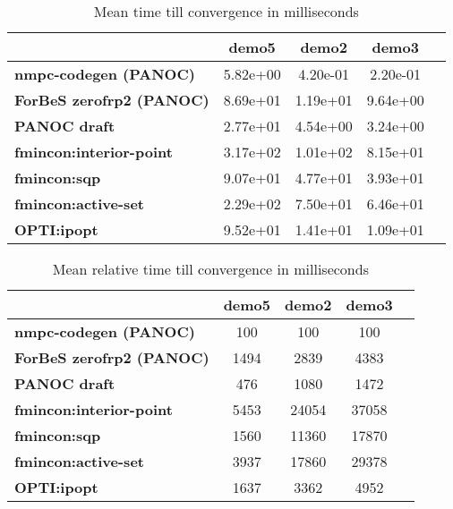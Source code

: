 \begin{table}[H]
	\centering
	\begin{tabular}{|l|c|c|c|c|}
		\hline
		&\textbf{demo5}&\textbf{demo2}&\textbf{demo3}\\\hline
		\textbf{nmpc-codegen (PANOC)}&5.82e+00&4.20e-01&2.20e-01\\\hline
		\textbf{ForBeS zerofrp2 (PANOC)}&8.69e+01&1.19e+01&9.64e+00\\\hline
		\textbf{PANOC draft}&2.77e+01&4.54e+00&3.24e+00\\\hline
		\textbf{fmincon:interior-point}&3.17e+02&1.01e+02&8.15e+01\\\hline
		\textbf{fmincon:sqp}&9.07e+01&4.77e+01&3.93e+01\\\hline
		\textbf{fmincon:active-set}&2.29e+02&7.50e+01&6.46e+01\\\hline
		\textbf{OPTI:ipopt}&9.52e+01&1.41e+01&1.09e+01\\\hline
	\end{tabular}
	\caption{Mean time till convergence in milliseconds}
	\label{tbl:mean time till convergence with noise}
\end{table}

\begin{table}[H]
	\centering
	\begin{tabular}{|l|c|c|c|c|}
		\hline
		&\textbf{demo5}&\textbf{demo2}&\textbf{demo3}\\\hline
		\textbf{nmpc-codegen (PANOC)}&100&100&100\\\hline
		\textbf{ForBeS zerofrp2 (PANOC)}&1494&2839&4383\\\hline
		\textbf{PANOC draft}&476&1080&1472\\\hline
		\textbf{fmincon:interior-point}&5453&24054&37058\\\hline
		\textbf{fmincon:sqp}&1560&11360&17870\\\hline
		\textbf{fmincon:active-set}&3937&17860&29378\\\hline
		\textbf{OPTI:ipopt}&1637&3362&4952\\\hline
	\end{tabular}
	\caption{Mean relative time till convergence in milliseconds}
	\label{tbl:mean relative time till convergence with noise}
\end{table}

